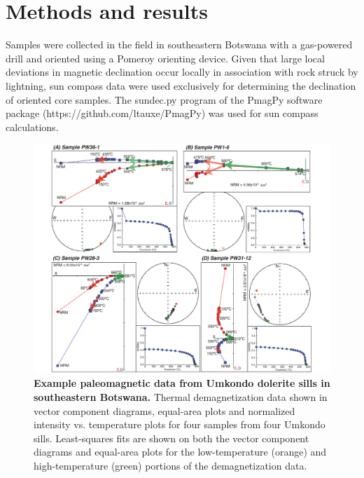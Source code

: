 \documentclass[11pt,letterpaper]{article}
\begin{document}
\section*{Methods and results}

Samples were collected in the field in southeastern Botswana with a gas-powered drill and oriented using a Pomeroy orienting device. Given that large local deviations in magnetic declination occur locally in association with rock struck by lightning, sun compass data were used exclusively for determining the declination of oriented core samples. The sundec.py program of the PmagPy software package (https://github.com/ltauxe/PmagPy) was used for sun compass calculations.

\begin{figure}[h!]
\includegraphics[width=6.5 in]{figures/Umkondo_pmag_data.pdf}
\caption{\textbf{ Example paleomagnetic data from Umkondo dolerite sills in southeastern Botswana.} Thermal demagnetization data shown in vector component diagrams, equal-area plots and normalized intensity vs. temperature plots for four samples from four Umkondo sills. Least-squares fits are shown on both the vector component diagrams and equal-area plots for the low-temperature (orange) and high-temperature (green) portions of the demagnetization data.}
\label{fig:pmag}
\end{figure}
\end{document}
